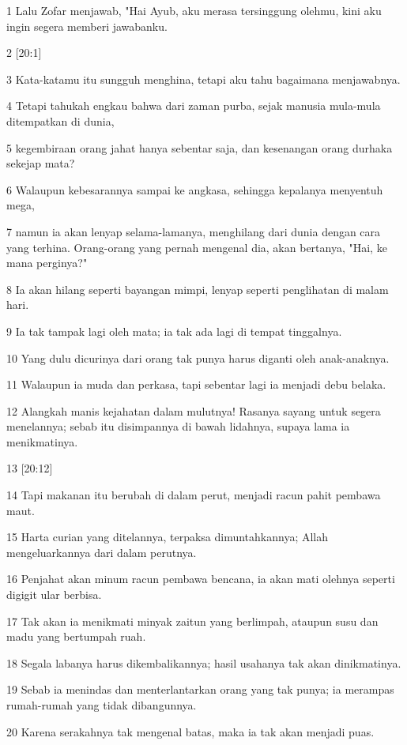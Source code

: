 \par 1 Lalu Zofar menjawab, "Hai Ayub, aku merasa tersinggung olehmu, kini aku ingin segera memberi jawabanku.
\par 2 [20:1]
\par 3 Kata-katamu itu sungguh menghina, tetapi aku tahu bagaimana menjawabnya.
\par 4 Tetapi tahukah engkau bahwa dari zaman purba, sejak manusia mula-mula ditempatkan di dunia,
\par 5 kegembiraan orang jahat hanya sebentar saja, dan kesenangan orang durhaka sekejap mata?
\par 6 Walaupun kebesarannya sampai ke angkasa, sehingga kepalanya menyentuh mega,
\par 7 namun ia akan lenyap selama-lamanya, menghilang dari dunia dengan cara yang terhina. Orang-orang yang pernah mengenal dia, akan bertanya, "Hai, ke mana perginya?"
\par 8 Ia akan hilang seperti bayangan mimpi, lenyap seperti penglihatan di malam hari.
\par 9 Ia tak tampak lagi oleh mata; ia tak ada lagi di tempat tinggalnya.
\par 10 Yang dulu dicurinya dari orang tak punya harus diganti oleh anak-anaknya.
\par 11 Walaupun ia muda dan perkasa, tapi sebentar lagi ia menjadi debu belaka.
\par 12 Alangkah manis kejahatan dalam mulutnya! Rasanya sayang untuk segera menelannya; sebab itu disimpannya di bawah lidahnya, supaya lama ia menikmatinya.
\par 13 [20:12]
\par 14 Tapi makanan itu berubah di dalam perut, menjadi racun pahit pembawa maut.
\par 15 Harta curian yang ditelannya, terpaksa dimuntahkannya; Allah mengeluarkannya dari dalam perutnya.
\par 16 Penjahat akan minum racun pembawa bencana, ia akan mati olehnya seperti digigit ular berbisa.
\par 17 Tak akan ia menikmati minyak zaitun yang berlimpah, ataupun susu dan madu yang bertumpah ruah.
\par 18 Segala labanya harus dikembalikannya; hasil usahanya tak akan dinikmatinya.
\par 19 Sebab ia menindas dan menterlantarkan orang yang tak punya; ia merampas rumah-rumah yang tidak dibangunnya.
\par 20 Karena serakahnya tak mengenal batas, maka ia tak akan menjadi puas.
